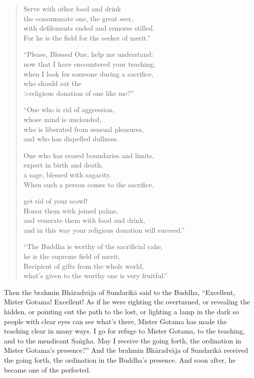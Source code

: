\documentclass[12pt,openany]{book}%
\begin{document}
\begin{verse}
Serve with other food and drink \\
the consummate one, the great seer, \\
with defilements ended and remorse stilled. \\
For he is the field for the seeker of merit.” 

“Please, Blessed One, help me understand: \\
now that I have encountered your teaching, \\
when I look for someone during a sacrifice, \\
who should eat the \\>religious donation of one like me?” 

“One who is rid of aggression, \\
whose mind is unclouded, \\
who is liberated from sensual pleasures, \\
and who has dispelled dullness. 

One who has erased boundaries and limits, \\
expert in birth and death, \\
a sage, blessed with sagacity. \\
When such a person comes to the sacrifice, 

get rid of your scowl! \\
Honor them with joined palms, \\
and venerate them with food and drink, \\
and in this way your religious donation will succeed.” 

“The Buddha is worthy of the sacrificial cake, \\
he is the supreme field of merit, \\
Recipient of gifts from the whole world, \\
what’s given to the worthy one is very fruitful.” 

%
\end{verse}

Then the brahmin \textsanskrit{Bhāradvāja} of \textsanskrit{Sundarikā} said to the Buddha, “Excellent, Mister Gotama! Excellent! As if he were righting the overturned, or revealing the hidden, or pointing out the path to the lost, or lighting a lamp in the dark so people with clear eyes can see what’s there, Mister Gotama has made the teaching clear in many ways. I go for refuge to Mister Gotama, to the teaching, and to the mendicant \textsanskrit{Saṅgha}. May I receive the going forth, the ordination in Mister Gotama’s presence?” And the brahmin \textsanskrit{Bhāradvāja} of \textsanskrit{Sundarikā} received the going forth, the ordination in the Buddha’s presence. And soon after, he became one of the perfected. 
\end{document}
